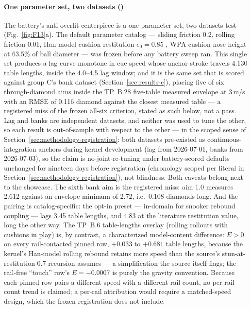 \paragraph{One parameter set, two datasets ()}
The battery's anti-overfit centerpiece is a one-parameter-set,
two-datasets test (Fig.~\ref{fig:F13}a). The default parameter catalog
--- sliding friction 0.2, rolling friction 0.01, Han-model cushion
restitution $e_0 = 0.85$ \citep{han2005dynamics}, WPA cushion-nose height
at 63.5\% of ball diameter --- was frozen before any battery sweep ran.
This single set produces a lag curve monotone in cue speed whose anchor
stroke travels 4.130 table lengths, inside the 4.0--4.5 lag window; and
it is the same set that is scored against group C's bank dataset
(Section~\ref{sec:results-c}), placing five of six through-diamond aims
inside the TP~B.28 five-table measured envelope \citep{alciatore_tp_b28}
at 3\,m/s with an RMSE of 0.116 diamond against the closest measured
table --- a registered miss of the frozen all-six criterion, stated as
such below, not a pass. Lag and banks are independent datasets, and
neither was used to tune the other, so each result is out-of-sample with
respect to the other --- in the scoped sense of
Section~\ref{sec:methodology-registration}: both datasets pre-existed as
continuous-integration anchors during kernel development (lag from
2026-07-01, banks from 2026-07-03), so the claim is no-joint-re-tuning
under battery-scored defaults unchanged for nineteen days before
registration (chronology scoped per literal in
Section~\ref{sec:methodology-registration}), not blindness.
Both caveats belong next to the showcase. The
sixth bank aim is the registered miss: aim 1.0 measures 2.612 against an
envelope minimum of 2.72, i.e.\ 0.108 diamonds long. And the pairing is
catalog-specific: the opt-in  preset --- in-domain
for snooker rebound coupling --- lags 3.45 table lengths, and 4.83 at the
literature restitution value, long the other way. The TP~B.6 table-lengths overlay (rolling
rollouts with cushions in play) is, by contrast, a characterized
model-content difference: $E > 0$ on every rail-contacted pinned row,
$+0.033$ to $+0.681$ table lengths, because the kernel's Han-model
rolling rebound retains more speed than the source's
stun-at-restitution-0.7 recursion assumes --- a simplification the source
itself flags; the rail-free
``touch'' row's $E = -0.0007$ is purely the gravity convention. Because
each pinned row pairs a different speed with a different rail count, no
per-rail-count trend is claimed; a per-rail attribution would require a
matched-speed design, which the frozen registration does not include.

